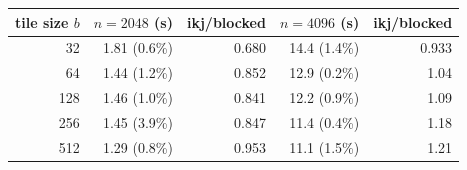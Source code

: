 \begin{tabular}{rrrrr}
\toprule
tile size $b$ & $n=2048$ (s) & ikj/blocked & $n=4096$ (s) & ikj/blocked \\
\midrule
32 & 1.81 (0.6\%) & 0.680 & 14.4 (1.4\%) & 0.933 \\
64 & 1.44 (1.2\%) & 0.852 & 12.9 (0.2\%) & 1.04 \\
128 & 1.46 (1.0\%) & 0.841 & 12.2 (0.9\%) & 1.09 \\
256 & 1.45 (3.9\%) & 0.847 & 11.4 (0.4\%) & 1.18 \\
512 & 1.29 (0.8\%) & 0.953 & 11.1 (1.5\%) & 1.21 \\
\bottomrule
\end{tabular}
